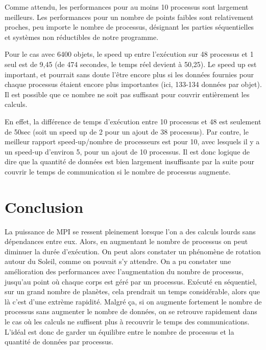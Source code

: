 \documentclass[a4paper,11pt]{article}
\begin{document}
Comme attendu, les performances pour au moins 10 processus sont largement meilleurs.
Les performances pour un nombre de points faibles sont relativement proches, peu importe le nombre de processus, désignant les parties séquentielles et systèmes non réductibles de notre programme.

Pour le cas avec 6400 objets, le speed up entre l'exécution sur 48 processus et 1 seul est de 9,45 (de 474 secondes, le temps réel devient à 50,25).
Le speed up est important, et pourrait sans doute l'être encore plus si les données fournies pour chaque processus étaient encore plus importantes (ici, 133-134 données par objet).
Il est possible que ce nombre ne soit pas suffisant pour couvrir entièrement les calculs. 

En effet, la différence de temps d'exécution entre 10 processus et 48 est seulement de 50sec (soit un speed up de 2 pour un ajout de 38 processus).
Par contre, le meilleur rapport speed-up/nombre de processeurs est pour 10, avec lesquels il y a un speed-up d'environ 5, pour un ajout de 10 processus.
Il est donc logique de dire que la quantité de données est bien largement insuffisante par la suite pour couvrir le temps de communication si le nombre de processus augmente. 

\section{Conclusion}


La puissance de MPI se ressent pleinement lorsque l'on a des calculs lourds sans dépendances entre eux. Alors, en augmentant le nombre de processus on peut diminuer la durée d'exécution. On peut alors constater un phénomène de rotation autour du Soleil, comme on pouvait s'y attendre. On a pu constater une amélioration des performances avec l'augmentation du nombre de processus, jusqu'au point où chaque corps est géré par un processus. Exécuté en séquentiel, sur un grand nombre de planètes, cela prendrait un temps considérable, alors que là c'est d'une extrème rapidité. Malgré ça, si on augmente fortement le nombre de processus sans augmenter le nombre de données, on se retrouve rapidement dans le cas où les calculs ne suffisent plus à recouvrir le temps des communications. L'idéal est donc de garder un équilibre entre le nombre de processus et la quantité de données par processus.
\end{document}
